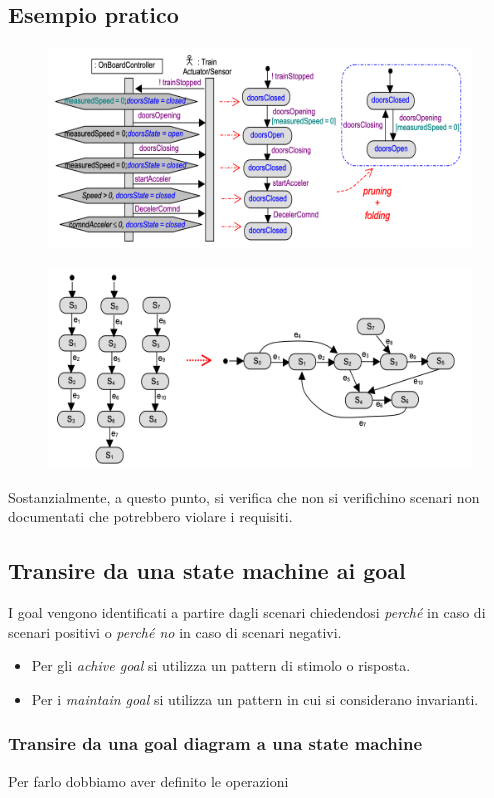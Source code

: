 \subsection{Esempio pratico}
\begin{figure}[H]
    \centering
    \includegraphics[scale=0.4]{img/da_scenari_a_state.png}
\end{figure}
\begin{figure}[H]
    \centering
    \includegraphics[scale=0.4]{img/merge_state.png}
\end{figure}
Sostanzialmente, a questo punto, si verifica che non si verifichino 
scenari non documentati che potrebbero violare i requisiti.

\subsection{Transire da una state machine ai goal}
I goal vengono identificati a partire dagli scenari chiedendosi \textit{perché} in 
caso di scenari positivi o 
\textit{perché no} in caso di scenari negativi.

\begin{itemize}
    \item Per gli \textit{achive goal} si utilizza un pattern di 
    stimolo o risposta.
    \item Per i \textit{maintain goal} si utilizza un pattern in 
    cui si considerano invarianti.
\end{itemize}

\subsubsection{Transire da una goal diagram a una state machine}
Per farlo dobbiamo aver definito le operazioni